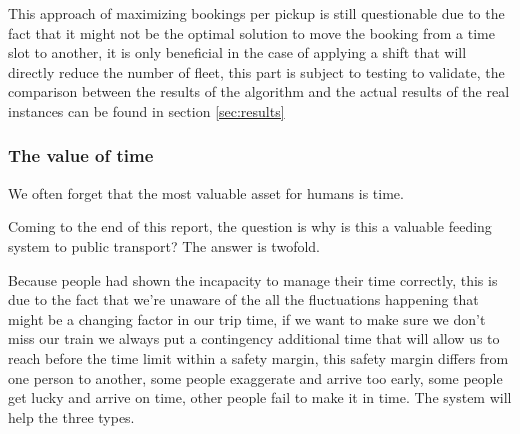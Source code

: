\documentclass{article}
\begin{document}

This approach of maximizing bookings per pickup is still questionable due to the fact that it might not be the optimal solution to move the booking from a time slot to another, it is only beneficial in the case of applying a shift that will directly reduce the number of fleet, this part is subject to testing to validate, the comparison between the results of the algorithm and the actual results of the real instances can be found in section \ref{sec:results}

\subsubsection*{The value of time}

\begin{flushright}
We often forget that the most valuable asset for humans is time.
\end{flushright}

Coming to the end of this report, the question is why is this a valuable feeding system to public transport?
The answer is twofold. 

Because people had shown the incapacity to manage their time correctly, this is due to the fact that we\rq{re} unaware of the all the fluctuations happening that might be a changing factor in our trip time, if we want to make sure we don\rq{t} miss our train we always put a contingency additional time that will allow us to reach before the time limit within a safety margin, this safety margin differs from one person to another, some people exaggerate and arrive too early, some people get lucky and arrive on time, other people fail to 
make it in time. The system will help the three types. 
\end{document}

